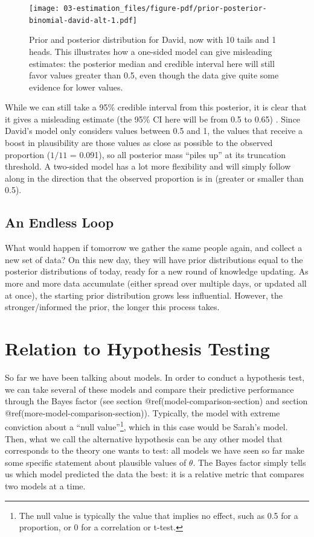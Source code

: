 \documentclass[
  letterpaper,
  DIV=11,
  numbers=noendperiod]{scrreprt}
\begin{document}
\begin{figure}

{\centering \texttt{[image: 03-estimation\_files/figure-pdf/prior-posterior-binomial-david-alt-1.pdf]}

}

\caption{Prior and posterior distribution for David, now with 10 tails
and 1 heads. This illustrates how a one-sided model can give misleading
estimates: the posterior median and credible interval here will still
favor values greater than 0.5, even though the data give quite some
evidence for lower values.}

\end{figure}

While we can still take a 95\% credible interval from this posterior, it
is clear that it gives a misleading estimate (the 95\% CI here will be
from 0.5 to 0.65) . Since David's model only considers values between
0.5 and 1, the values that receive a boost in plausibility are those
values as close as possible to the observed proportion (\(1/11\) =
0.091), so all posterior mass ``piles up'' at its truncation threshold.
A two-sided model has a lot more flexibility and will simply follow
along in the direction that the observed proportion is in (greater or
smaller than 0.5).

\hypertarget{an-endless-loop}{%
\subsection{An Endless Loop}\label{an-endless-loop}}

What would happen if tomorrow we gather the same people again, and
collect a new set of data? On this new day, they will have prior
distributions equal to the posterior distributions of today, ready for a
new round of knowledge updating. As more and more data accumulate
(either spread over multiple days, or updated all at once), the starting
prior distribution grows less influential. However, the
stronger/informed the prior, the longer this process takes.

\hypertarget{relation-to-hypothesis-testing}{%
\section{Relation to Hypothesis
Testing}\label{relation-to-hypothesis-testing}}

So far we have been talking about models. In order to conduct a
hypothesis test, we can take several of these models and compare their
predictive performance through the Bayes factor (see section
@ref(model-comparison-section) and section
@ref(more-model-comparison-section)). Typically, the model with extreme
conviction about a ``null value''\footnote{The null value is typically
  the value that implies no effect, such as 0.5 for a proportion, or 0
  for a correlation or t-test.}, which in this case would be Sarah's
model. Then, what we call the alternative hypothesis can be any other
model that corresponds to the theory one wants to test: all models we
have seen so far make some specific statement about plausible values of
\(\theta\). The Bayes factor simply tells us which model predicted the
data the best: it is a relative metric that compares two models at a
time.
\end{document}
